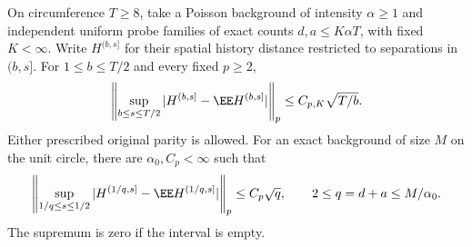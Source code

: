 \documentclass[11pt,letterpaper]{article}
\begin{document}
\begin{theorem}
\label{thm:late-history-maximal}
On circumference $T\ge8$, take a Poisson background of intensity
$\alpha\ge1$ and independent uniform probe families of exact
counts $d,a\le K\alpha T$, with fixed $K<\infty$.
Write $H^{(b,s]}$ for their spatial history distance restricted
to separations in $(b,s]$. For $1\le b\le T/2$ and every
fixed $p\ge2$,
\begin{equation}\label{eq:Poisson-late-history-maximal}
 \left\|\sup_{b\le s\le T/2}
   |H^{(b,s]}-\EE H^{(b,s]}|\right\|_p
                 \le C_{p,K}\sqrt{T/b}.
\end{equation}
Either prescribed original parity is allowed.
For an exact background of size $M$ on the unit circle, there
are $\alpha_0,C_p<\infty$ such that
\begin{equation}\label{eq:finite-late-history-maximal}
 \left\|\sup_{1/q\le s\le1/2}
   |H^{(1/q,s]}-\EE H^{(1/q,s]}|\right\|_p
                     \le C_p\sqrt q,\qquad
             2\le q=d+a\le M/\alpha_0.
\end{equation}
The supremum is zero if the interval is empty.
\end{theorem}
\end{document}

